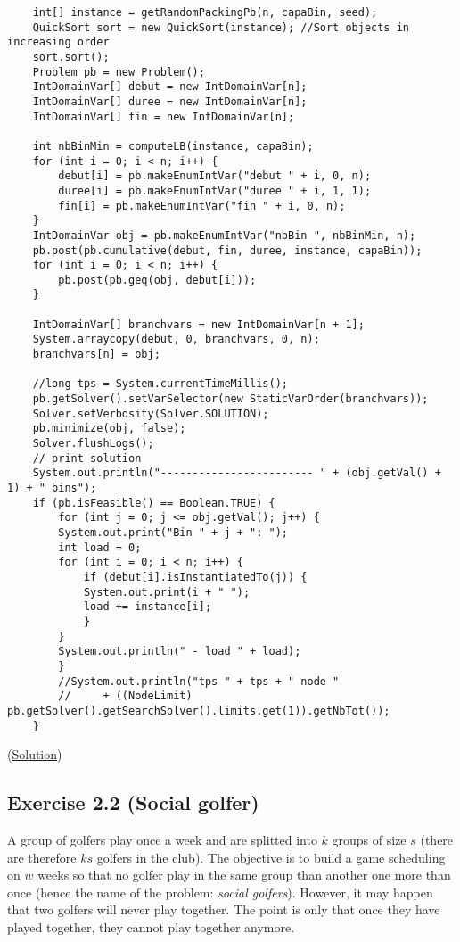 \begin{lstlisting}
	int[] instance = getRandomPackingPb(n, capaBin, seed); 
	QuickSort sort = new QuickSort(instance); //Sort objects in increasing order
	sort.sort(); 
	Problem pb = new Problem(); 
	IntDomainVar[] debut = new IntDomainVar[n]; 
	IntDomainVar[] duree = new IntDomainVar[n]; 
	IntDomainVar[] fin = new IntDomainVar[n]; 
	 
	int nbBinMin = computeLB(instance, capaBin); 
	for (int i = 0; i < n; i++) { 
	    debut[i] = pb.makeEnumIntVar("debut " + i, 0, n); 
	    duree[i] = pb.makeEnumIntVar("duree " + i, 1, 1); 
	    fin[i] = pb.makeEnumIntVar("fin " + i, 0, n); 
	} 
	IntDomainVar obj = pb.makeEnumIntVar("nbBin ", nbBinMin, n); 
	pb.post(pb.cumulative(debut, fin, duree, instance, capaBin)); 
	for (int i = 0; i < n; i++) { 
	    pb.post(pb.geq(obj, debut[i])); 
	} 
	 
	IntDomainVar[] branchvars = new IntDomainVar[n + 1]; 
	System.arraycopy(debut, 0, branchvars, 0, n); 
	branchvars[n] = obj; 
	 
	//long tps = System.currentTimeMillis(); 
	pb.getSolver().setVarSelector(new StaticVarOrder(branchvars)); 
	Solver.setVerbosity(Solver.SOLUTION); 
	pb.minimize(obj, false); 
	Solver.flushLogs(); 
	// print solution 
	System.out.println("------------------------ " + (obj.getVal() + 1) + " bins"); 
	if (pb.isFeasible() == Boolean.TRUE) { 
	    for (int j = 0; j <= obj.getVal(); j++) { 
	    System.out.print("Bin " + j + ": "); 
	    int load = 0; 
	    for (int i = 0; i < n; i++) { 
	        if (debut[i].isInstantiatedTo(j)) { 
	        System.out.print(i + " "); 
	        load += instance[i]; 
	        } 
	    } 
	    System.out.println(" - load " + load); 
	    } 
	    //System.out.println("tps " + tps + " node " 
        //     + ((NodeLimit) pb.getSolver().getSearchSolver().limits.get(1)).getNbTot()); 
	}
\end{lstlisting}

(\hyperlink{solutions:solutionofexercise2.1}{Solution})

\subsection{Exercise 2.2 (Social golfer)}\label{exercises:exercise2.2}\hypertarget{exercises:exercise2.2}{}

A group of golfers play once a week and are splitted into $k$ groups of size $s$ (there are therefore $ks$ golfers in the club). The objective is to build a game scheduling on $w$ weeks so that no golfer play in the same group than another one more than once (hence the name of the problem: \emph{social golfers}). However, it may happen that two golfers will never play together. The point is only that once they have played together, they cannot play together anymore. 

